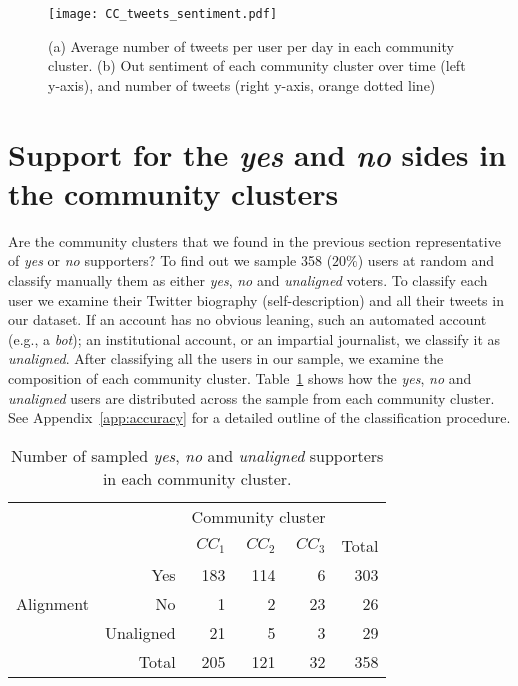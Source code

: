 \documentclass{article}
\begin{document}
\begin{figure}[tp]
  \centering
  \texttt{[image: CC\_tweets\_sentiment.pdf]}
  \caption{(a) Average number of tweets per user per day in each
    community cluster. (b) Out sentiment of each community cluster
    over time (left y-axis), and number of tweets (right y-axis,
    orange dotted line)}\label{fig:TSAverageTPU}
\end{figure}

\section{Support for the {\it yes} and {\it no} sides in the
community clusters}
\label{sec:classAccuracy}

Are the community clusters that we found in the previous section
representative of {\it yes} or {\it no} supporters? To find out we
sample 358 ($20\%$) users at random and classify manually them as
either \textit{yes}, \textit{no} and \textit{unaligned} voters. To
classify each user we examine their Twitter biography
(self-description) and all their tweets in our dataset. If an account
has no obvious leaning, such an automated account (e.g., a {\it bot});
an institutional account, or an impartial journalist, we classify it
as {\it unaligned}. After classifying all the users in our sample, we
examine the composition of each community
cluster. Table~\ref{tab:comBD} shows how the {\it yes}, {\it no} and
{\it unaligned} users are distributed across the sample from each
community cluster. See Appendix~\ref{app:accuracy} for a detailed
outline of the classification procedure.

\begin{table}[tp]
\centering
\begin{tabular}{lr|rrr|r}
          &  & \multicolumn{3}{c|}{Community cluster} & \\
          &  & $CC_1$ & $CC_2$ & $CC_3$ & Total \\ \hline
          & Yes               & 183    & 114    & 6      & 303   \\
 Alignment & No                & 1      & 2      & 23     & 26    \\
          & Unaligned         & 21     & 5      & 3      & 29    \\ \hline
          & Total             & 205    & 121    & 32     & 358  
\end{tabular}
\caption{Number of sampled {\it yes}, {\it no} and {\it unaligned}
  supporters in each community cluster.}\label{tab:comBD}
\end{table}
\end{document}
